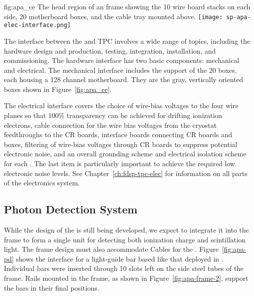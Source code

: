 \begin{dunefigure}{fig:apa_ce}
{The head region of an  frame showing the 10 wire board stacks on each side, \num{20}  motherboard boxes, and the cable tray mounted above.}
\texttt{[image: sp-apa-elec-interface.png]}
\end{dunefigure}

The interface between the  and TPC  involves a wide range of topics, including the hardware design and production, testing, integration, installation, and commissioning. The hardware interface has two basic components: mechanical and electrical. The mechanical interface includes the support of the \num{20}  boxes, each housing a \num{128} channel  motherboard.  They are the gray, vertically oriented boxes shown in Figure~\ref{fig:apa_ce}. 

The electrical interface covers the choice of wire-bias voltages to the four wire planes so that \num{100}\% transparency can be achieved for drifting ionization electrons, cable connection for the wire bias voltages from the cryostat feedthroughs to the CR boards, interface boards connecting CR boards and  boxes, filtering of wire-bias voltages through CR boards to suppress potential electronic noise, and an overall grounding scheme and electrical isolation scheme for each . The last item is particularly important to achieve the required low electronic noise levels.  See Chapter~\ref{ch:fdsp-tpc-elec} for information on all parts of the  electronics system.


\subsection{Photon Detection System}
\label{sec:fdsp-apa-intfc-pds}

While the design of the  is still being developed, we expect to integrate it into the  frame to form a single unit for detecting both ionization charge and scintillation light.  The  frame design must also accommodate Cables for the  .  Figure~\ref{fig:apa-pd} shows the interface for a light-guide bar based  like that deployed in . Individual bars were inserted through \num{10} slots left on the side steel tubes of the frame. Rails mounted in the  frame, as shown in Figure~\ref{fig:apa-frame-2}, support the bars in their final positions. 

